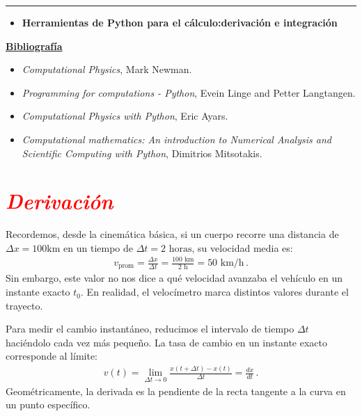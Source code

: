 \documentclass[12pt]{article}
\begin{document}
		\thispagestyle{firstpage}
		\vspace*{1.5cm}
	
	\begin{center}
		\rule{\textwidth}{0.4pt}
	\end{center}
	
	\begin{itemize}[leftmargin=*,label=\textcolor{red}{\ensuremath{\blacktriangleright}}]
		\item \textbf{Herramientas de Python para el cálculo:derivación e integración}
	\end{itemize}
	
	\noindent
	\textbf{\underline{Bibliografía}}
	\begin{itemize}[leftmargin=*, label={\textcolor{blue}{$\bullet$}}]
		\item \textit{Computational Physics}, Mark Newman.
      \item \textit{Programming for computations - Python}, Evein Linge and Petter Langtangen. 
      \item \textit{Computational Physics with Python}, Eric Ayars. 
      \item \textit{Computational mathematics: An introduction to Numerical Analysis and Scientific Computing  with Python},
      Dimitrios Mitsotakis. 
    \end{itemize}
     

\section*{\textcolor{red}{\textit{Derivación}}}

Recordemos,  desde la cinemática básica, si un cuerpo recorre 
una distancia de $\Delta x = 100\text{km}$ en un tiempo de 
$\Delta t = 2\text{ horas}$, su velocidad media es:
\begin{align*}
    v_{\text{prom}} = \frac{\Delta x}{\Delta t} = \frac{100\text{ km}}{2\text{ h}} = 50\text{ km/h}\,.
\end{align*}
Sin embargo, este valor no nos dice a qué velocidad avanzaba el vehículo en 
un instante exacto $t_0$. En realidad, 
el velocímetro marca distintos valores durante el trayecto.

Para medir el cambio instantáneo, reducimos el intervalo de tiempo 
$\Delta t$ haciéndolo cada vez más pequeño. La tasa de cambio en un
instante exacto corresponde al límite:
\begin{align*}
    v(t) = \lim_{\Delta t \to 0} \frac{x(t + \Delta t) - x(t)}{\Delta t} = \frac{dx}{dt}\,.
\end{align*}
Geométricamente, la derivada es la pendiente de la recta tangente 
a la curva en un punto específico.
\end{document}
